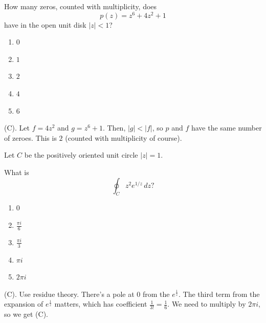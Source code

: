 \begin{exercise}
How many zeros, counted with multiplicity,
does
\[
p(z)=z^6+4z^2+1
\]
have in the open unit disk $|z|<1$?
\begin{enumerate}[label=(\Alph*)]
\item $0$
\item $1$
\item $2$
\item $4$
\item $6$
\end{enumerate}
\end{exercise}
\begin{solution}
(C). Let $f = 4z^2$ and $g = z^6 + 1$. Then, $|g| < |f|$, so $p$ 
and $f$ have the same number of zeroes. This is $2$ (counted with multiplicity of course).
\end{solution}

\begin{exercise}
Let $C$ be the positively oriented
unit circle $|z|=1$.

What is
\[
\oint_C z^2e^{1/z}\,dz?
\]

\begin{enumerate}[label=(\Alph*)]
\item $0$
\item $\frac{\pi i}{6}$
\item $\frac{\pi i}{3}$
\item $\pi i$
\item $2\pi i$
\end{enumerate}
\end{exercise}
\begin{solution}
(C). Use residue theory. There's a pole at $0$ from the $e^{\frac{1}{z}}$.
The third term from the expansion of $e^{\frac{1}{z}}$ matters, which has 
coefficient $\frac{1}{3!} = \frac{1}{6}$. We need to multiply by $2\pi i$, so
we get (C).
\end{solution}